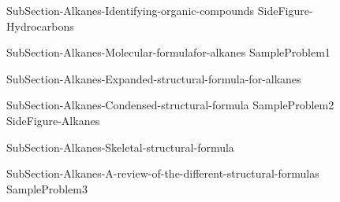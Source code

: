\documentclass[main.tex]{subfiles}
\begin{document}
\sloppy\begin{description}

\item[]{SubSection-Alkanes-Identifying-organic-compounds}
\hspace{-5cm}{Table-Organic-Prefixes}
{SideFigure-Hydrocarbons}
\item[]{SubSection-Alkanes-Molecular-formulafor-alkanes}
{SampleProblem1}
\item[] {SubSection-Alkanes-Expanded-structural-formula-for-alkanes} 
\vspace{.5cm}{Table-Alkane-names}
\item[]{SubSection-Alkanes-Condensed-structural-formula}
{SampleProblem2}
{SideFigure-Alkanes}

\item[]{SubSection-Alkanes-Skeletal-structural-formula}
\item[]{SubSection-Alkanes-A-review-of-the-different-structural-formulas}
{SampleProblem3}
\end{description}






 
\end{document}
